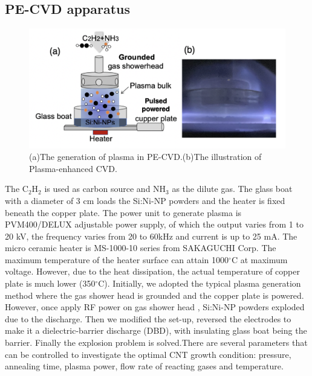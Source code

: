 \subsection{PE-CVD apparatus}
\begin{figure}[H]
\centering
\includegraphics[width=14cm]{src/fig/fig22.png}
\caption{(a)The generation of plasma in PE-CVD.(b)The illustration of Plasma-enhanced CVD.}
\end{figure}
The $\mathrm{C_{2}H_{2}}$ is used as carbon source and $\mathrm{NH_{3}}$ as the dilute gas. The glass boat with a diameter of 3 cm loads the Si:Ni-NP powders and the heater is fixed beneath the copper plate. The power unit to generate plasma is PVM400/DELUX adjustable power supply, of which the output varies from 1 to 20 kV, the frequency varies from 20 to 60kHz and current is up to 25 mA. The micro ceramic heater is MS-1000-10 series from SAKAGUCHI Corp. The maximum temperature of the heater surface can attain 1000\(^\circ\)C at maximum voltage. However, due to the heat dissipation, the actual temperature of copper plate is much lower (350\(^\circ\)C). Initially, we adopted the typical plasma generation method where the gas shower head is grounded and the copper plate is powered. However, once apply RF power on gas shower head , Si:Ni-NP powders exploded due to the discharge. Then we modified the set-up, reversed the electrodes to make it a dielectric-barrier discharge (DBD), with insulating glass boat being the barrier. Finally the explosion problem is solved.There are several parameters that can be controlled to investigate the optimal CNT growth condition: pressure, annealing time, plasma power, flow rate of reacting gases and temperature.

